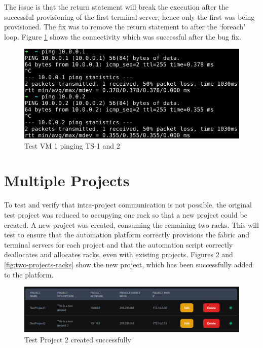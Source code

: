 The issue is that the return statement will break the execution after the successful provisioning of the first terminal server, hence only the first was being provisioned. The fix was to remove the return statement to after the `foreach' loop. Figure \ref{fig:terminal-server-ping} shows the connectivity which was successful after the bug fix.

\begin{figure}[H]
    \centering
    \includegraphics[scale=1.5]{images/terminal-server-ping.png}
    \caption{Test VM 1 pinging TS-1 and 2}
    \label{fig:terminal-server-ping}
\end{figure}

\section{Multiple Projects}
To test and verify that intra-project communication is not possible, the original test project was reduced to occupying one rack so that a new project could be created. A new project was created, consuming the remaining two racks. This will test to ensure that the automation platform correctly provisions the fabric and terminal servers for each project and that the automation script correctly deallocates and allocates racks, even with existing projects. Figures \ref{fig:two-projects} and \ref{fig:two-projects-racks} show the new project, which has been successfully added to the platform.

\begin{figure}[H]
    \centering
    \includegraphics[scale=1]{images/two-projects.png}
    \caption{Test Project 2 created successfully}
    \label{fig:two-projects}
\end{figure}


